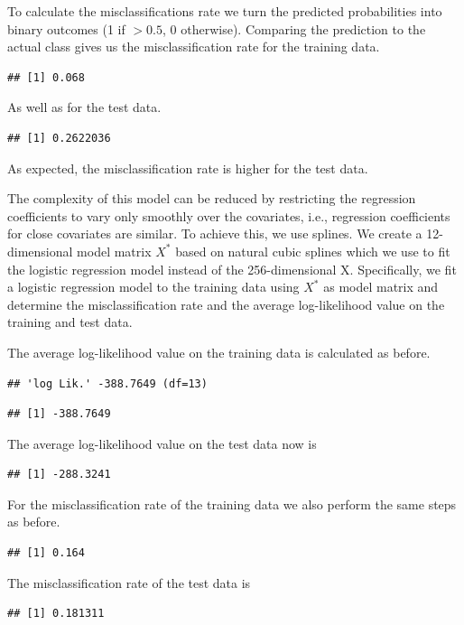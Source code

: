 \documentclass[
]{article}
\begin{document}
To calculate the misclassifications rate we turn the predicted
probabilities into binary outcomes (1 if \(>0.5\), 0 otherwise).
Comparing the prediction to the actual class gives us the
misclassification rate for the training data.

\begin{verbatim}
## [1] 0.068
\end{verbatim}

As well as for the test data.

\begin{verbatim}
## [1] 0.2622036
\end{verbatim}

As expected, the misclassification rate is higher for the test data.

The complexity of this model can be reduced by restricting the
regression coefficients to vary only smoothly over the covariates, i.e.,
regression coefficients for close covariates are similar. To achieve
this, we use splines. We create a 12-dimensional model matrix \(X^*\)
based on natural cubic splines which we use to fit the logistic
regression model instead of the 256-dimensional X. Specifically, we fit
a logistic regression model to the training data using \(X^*\) as model
matrix and determine the misclassification rate and the average
log-likelihood value on the training and test data.

The average log-likelihood value on the training data is calculated as
before.

\begin{verbatim}
## 'log Lik.' -388.7649 (df=13)
\end{verbatim}

\begin{verbatim}
## [1] -388.7649
\end{verbatim}

The average log-likelihood value on the test data now is

\begin{verbatim}
## [1] -288.3241
\end{verbatim}

For the misclassification rate of the training data we also perform the
same steps as before.

\begin{verbatim}
## [1] 0.164
\end{verbatim}

The misclassification rate of the test data is

\begin{verbatim}
## [1] 0.181311
\end{verbatim}
\end{document}
